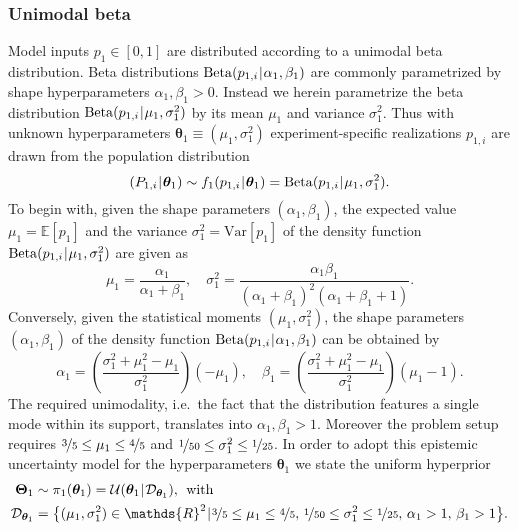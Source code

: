 \subsubsection{Unimodal beta}
Model inputs \(p_1 \in [0,1]\) are distributed according to a unimodal beta distribution.
Beta distributions \(\mathrm{Beta}(p_{1,i} {\:\!}|{\:\!} \alpha_1,\beta_1)\) are commonly parametrized by shape hyperparameters \(\alpha_1,\beta_1 > 0\).
Instead we herein parametrize the beta distribution \(\mathrm{Beta}(p_{1,i} {\:\!}|{\:\!} \mu_1,\sigma^2_1)\) by its mean \(\mu_1\) and variance \(\sigma^2_1\).
Thus with unknown hyperparameters \(\bm{\theta}_1 \equiv (\mu_1,\sigma^2_1)\) experiment-specific realizations \(p_{1,i}\) are drawn from the population distribution
\begin{equation} \label{eq:JAIS:Distr:p1}
  (P_{1,i} {\:\!}|{\:\!} \bm{\theta}_1) \sim f_1(p_{1,i} {\:\!}|{\:\!} \bm{\theta}_1)  = \mathrm{Beta}(p_{1,i} {\:\!}|{\:\!} \mu_1,\sigma^2_1).
\end{equation}
To begin with, given the shape parameters \((\alpha_1,\beta_1)\), the expected value \(\mu_1 = \mathds{E}[p_1]\) and the variance \(\sigma^2_1 = \mathrm{Var}[p_1]\)
of the density function \(\mathrm{Beta}(p_{1,i} {\:\!}|{\:\!} \mu_1,\sigma^2_1)\) are given as
\begin{equation} \label{eq:JAIS:Beta:Transform2Stat}
  \mu_1 = \frac{\alpha_1}{\alpha_1 + \beta_1}, \quad
  \sigma^2_1 = \frac{\alpha_1 \beta_1}{(\alpha_1 + \beta_1)^2 (\alpha_1 + \beta_1 + 1)}.
\end{equation}
Conversely, given the statistical moments \((\mu_1,\sigma^2_1)\), the shape parameters \((\alpha_1,\beta_1)\) of the density function \(\mathrm{Beta}(p_{1,i} {\:\!}|{\:\!} \alpha_1,\beta_1)\) can be obtained by
\begin{equation} \label{eq:JAIS:Beta:Transform2Shape}
  \alpha_1 = \left( \frac{\sigma^2_1 + \mu_1^2-\mu_1}{\sigma^2_1} \right) \left( -\mu_1 \right), \quad
  \beta_1  = \left( \frac{\sigma^2_1 + \mu_1^2-\mu_1}{\sigma^2_1} \right) \left( \mu_1 - 1 \right).
\end{equation}
The required unimodality, i.e.\ the fact that the distribution features a single mode within its support, translates into \(\alpha_1,\beta_1 > 1\).
Moreover the problem setup requires \(\nicefrac{3}{5} \leq \mu_1 \leq \nicefrac{4}{5}\) and \(\nicefrac{1}{50} \leq \sigma^2_1 \leq \nicefrac{1}{25}\).
In order to adopt this epistemic uncertainty model for the hyperparameters \(\bm{\theta}_1\) we state the uniform hyperprior
\begin{equation} \label{eq:JAIS:Prior:Hyper:p1}
  \begin{aligned}
    \bm{\Theta}_1 &\sim \pi_1(\bm{\theta}_1) = \mathcal{U}(\bm{\theta}_1 \cond \mathcal{D}_{\bm{\theta}_1}), \;\, \text{with} \\
    \mathcal{D}_{\bm{\theta}_1}
    &= \big\{ (\mu_1,\sigma^2_1) \in \mathds{R}^2 \cond \nicefrac{3}{5} \leq \mu_1 \leq \nicefrac{4}{5}, \, \nicefrac{1}{50} \leq \sigma^2_1 \leq \nicefrac{1}{25}, \, \alpha_1>1, \, \beta_1>1 \big\}.
  \end{aligned}
\end{equation}
